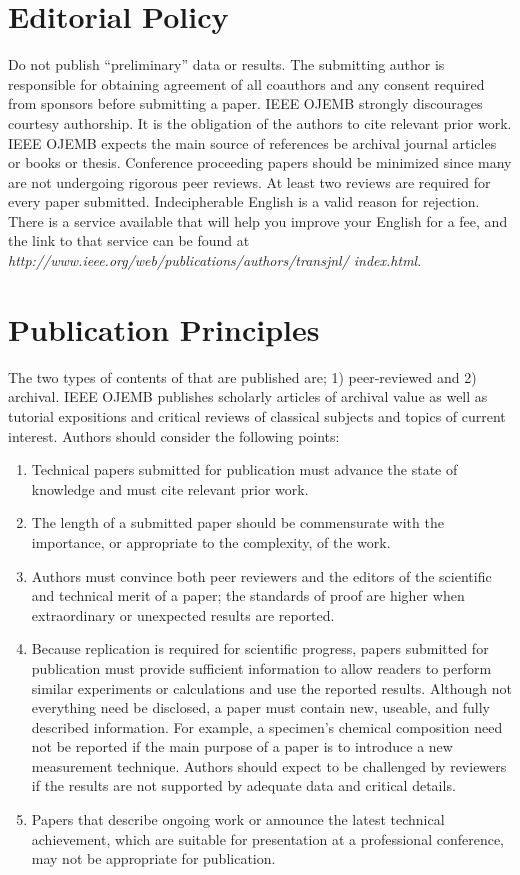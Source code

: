 \documentclass[journal]{IEEEtran}
\begin{document}
\section{Editorial Policy}
{
Do not publish “preliminary” data or results. The submitting author is responsible for obtaining agreement of all coauthors and any consent required from sponsors before submitting a paper. IEEE OJEMB strongly discourages courtesy authorship. It is the obligation of the authors to cite relevant prior work. IEEE OJEMB expects the main source of references be archival journal articles or books or thesis. Conference proceeding papers should be minimized since many are not undergoing rigorous peer reviews. 
At least two reviews are required for every paper submitted. Indecipherable English is a valid reason for rejection. There is a service available that will help you improve your English for a fee, and the link to that service can be found at \textit{http://www.ieee.org/web/publications/authors/transjnl/ index.html}. 
}

\section{Publication Principles}
{
	The two types of contents of that are published are; 1) peer-reviewed and 2) archival. IEEE OJEMB publishes scholarly articles of archival value as well as tutorial expositions and critical reviews of classical subjects and topics of current interest. 
	Authors should consider the following points:
	\begin{enumerate}
		\item Technical papers submitted for publication must advance the state of knowledge and must cite relevant prior work. 
		\item The length of a submitted paper should be commensurate with the importance, or appropriate to the complexity, of the work. 
		\item Authors must convince both peer reviewers and the editors of the scientific and technical merit of a paper; the standards of proof are higher when extraordinary or unexpected results are reported. 
		\item Because replication is required for scientific progress, papers submitted for publication must provide sufficient information to allow readers to perform similar experiments or calculations and use the reported results. Although not everything need be disclosed, a paper must contain new, useable, and fully described information. For example, a specimen’s chemical composition need not be reported if the main purpose of a paper is to introduce a new measurement technique. Authors should expect to be challenged by reviewers if the results are not supported by adequate data and critical details.
		\item Papers that describe ongoing work or announce the latest technical achievement, which are suitable for presentation at a professional conference, may not be appropriate for publication.
	\end{enumerate}
	
	
}
\end{document}
